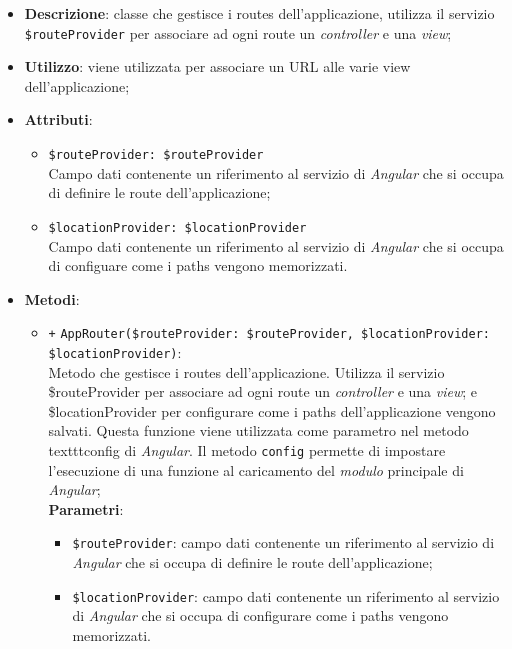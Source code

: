 	\begin{itemize}
		\item \textbf{Descrizione}: classe che gestisce i routes dell’applicazione, utilizza il servizio \texttt{\$routeProvider} per associare ad ogni route un \textit{controller} e una \textit{view};
		\item \textbf{Utilizzo}: viene utilizzata per associare un URL alle varie view dell'applicazione;
		\item \textbf{Attributi}:
		\begin{itemize}
			\item \texttt{\$routeProvider: \$routeProvider}\\ Campo dati contenente un riferimento al servizio di \textit{Angular} che si occupa di definire le route dell'applicazione;
			\item \texttt{\$locationProvider: \$locationProvider}\\ Campo dati contenente un riferimento al servizio di \textit{Angular} che si occupa di configuare come i paths vengono memorizzati.
		\end{itemize}
		\item \textbf{Metodi}: 
		\begin{itemize}
			\item \texttt{+} \texttt{AppRouter(\$routeProvider: \$routeProvider, \$locationProvider:\\ \$locationProvider)}: \\ Metodo che gestisce i routes dell'applicazione. Utilizza il servizio \$routeProvider per associare ad ogni route un \textit{controller} e una \textit{view}; e \$locationProvider per configurare come i paths dell'applicazione vengono salvati. Questa funzione viene utilizzata come parametro nel metodo texttt{config} di \textit{Angular}. Il metodo \texttt{config} permette di impostare l'esecuzione di una funzione al caricamento del \textit{modulo} principale di \textit{Angular};\\
			\textbf{Parametri}:
			\begin{itemize}
				\item \texttt{\$routeProvider}: campo dati contenente un riferimento al servizio di \textit{Angular} che si occupa di definire le route dell'applicazione;
				\item \texttt{\$locationProvider}: campo dati contenente un riferimento al servizio di \textit{Angular} che si occupa di configurare come i paths vengono memorizzati.
			\end{itemize}
		\end{itemize}
	\end{itemize}
	
